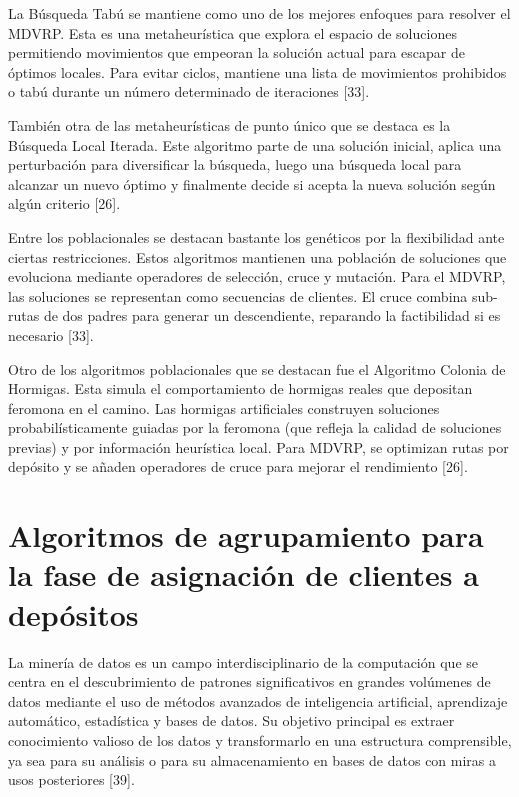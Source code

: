 La B\'usqueda Tab\'u se mantiene como uno de los mejores enfoques para resolver el MDVRP. Esta es una metaheur\'istica que explora el espacio de soluciones permitiendo movimientos que empeoran la soluci\'on actual para escapar de \'optimos locales. Para evitar ciclos, mantiene una lista de movimientos prohibidos o tab\'u durante un n\'umero determinado de iteraciones [33].

Tambi\'en otra de las metaheur\'isticas de punto \'unico que se destaca es la B\'usqueda Local Iterada. Este algoritmo parte de una soluci\'on inicial, aplica una perturbaci\'on para diversificar la b\'usqueda, luego una b\'usqueda local para alcanzar un nuevo \'optimo y finalmente decide si acepta la nueva soluci\'on seg\'un alg\'un criterio [26].

Entre los poblacionales se destacan bastante los gen\'eticos por la flexibilidad ante ciertas restricciones. Estos algoritmos mantienen una poblaci\'on de soluciones que evoluciona mediante operadores de selecci\'on, cruce y mutaci\'on. Para el MDVRP, las soluciones se representan como secuencias de clientes. El cruce combina sub-rutas de dos padres para generar un descendiente, reparando la factibilidad si es necesario [33].

Otro de los algoritmos poblacionales que se destacan fue el Algoritmo Colonia de Hormigas. Esta simula el comportamiento de hormigas reales que depositan feromona en el camino. Las hormigas artificiales construyen soluciones probabil\'isticamente guiadas por la feromona (que refleja la calidad de soluciones previas) y por informaci\'on heur\'istica local. Para MDVRP, se optimizan rutas por dep\'osito y se a\~naden operadores de cruce para mejorar el rendimiento [26].

\section{Algoritmos de agrupamiento para la fase de asignaci\'on de clientes a dep\'ositos}

La miner\'ia de datos es un campo interdisciplinario de la computaci\'on que se centra en el descubrimiento de patrones significativos en grandes vol\'umenes de datos mediante el uso de m\'etodos avanzados de inteligencia artificial, aprendizaje autom\'atico, estad\'istica y bases de datos. Su objetivo principal es extraer conocimiento valioso de los datos y transformarlo en una estructura comprensible, ya sea para su an\'alisis o para su almacenamiento en bases de datos con miras a usos posteriores [39].

